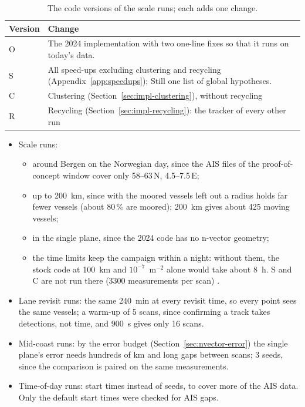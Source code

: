 \begin{table}[htbp]
\centering
\caption{The code versions of the scale runs; each adds one change.}
\label{tab:exp-versions}
\small
\begin{tabularx}{\textwidth}{l X}
\toprule
Version & Change \\
\midrule
O & The 2024 implementation \cite{ais_imm_pmbm} with two one-line fixes so that it runs on today's data. \\
S & All speed-ups excluding clustering and recycling (Appendix~\ref{app:speedups}); Still one list of global hypotheses. \\
C & Clustering (Section~\ref{sec:impl-clustering}), without recycling \\
R & Recycling (Section~\ref{sec:impl-recycling}): the tracker of every other run \\
\bottomrule
\end{tabularx}
\end{table}

\begin{itemize}
    \item Scale runs:
    \begin{itemize}
        \item around Bergen on the Norwegian day, since the AIS files of the proof-of-concept window cover only 58--63\,N, 4.5--7.5\,E; %
        \item up to 200~km, since with the moored vessels left out a radius holds far fewer vessels (about 80\,\% are moored); 200~km gives about 425 moving vessels; %
        \item in the single plane, since the 2024 code has no n-vector geometry; %
        \item the time limits keep the campaign within a night: without them, the stock code at 100~km and $10^{-7}$~m$^{-2}$ alone would take about 8~h. S and C are not run there (3300 measurements per scan) . %
    \end{itemize}
    \item Lane revisit runs: the same 240~min at every revisit time, so every point sees the same vessels; a warm-up of 5 scans, since confirming a track takes detections, not time, and 900~s gives only 16 scans. %
    \item Mid-coast runs: by the error budget (Section~\ref{sec:nvector-error}) the single plane's error needs hundreds of km and long gaps between scans; 3 seeds, since the comparison is paired on the same measurements. %
    \item Time-of-day runs: start times instead of seeds, to cover more of the AIS data. Only the default start times were checked for AIS gaps. %
\end{itemize}
